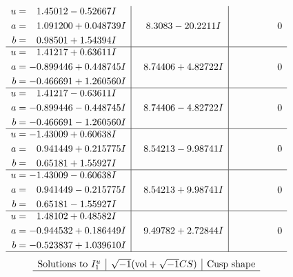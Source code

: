 \documentclass[1p]{elsarticle_modified}
\theoremstyle{definition}
\newcommand{\I}{\sqrt{-1}}
\begin{document}
$$\begin{array}{c|c|c}
\begin{aligned}
u &= \phantom{-}1.45012 - 0.52667 I \\
a &= \phantom{-}1.091200 + 0.048739 I \\
b &= \phantom{-}0.98501 + 1.54394 I\end{aligned}
 & \phantom{-}8.3083 - 20.2211 I & \phantom{-0.000000 } 0 \\ \hline\begin{aligned}
u &= \phantom{-}1.41217 + 0.63611 I \\
a &= -0.899446 + 0.448745 I \\
b &= -0.466691 + 1.260560 I\end{aligned}
 & \phantom{-}8.74406 + 4.82722 I & \phantom{-0.000000 } 0 \\ \hline\begin{aligned}
u &= \phantom{-}1.41217 - 0.63611 I \\
a &= -0.899446 - 0.448745 I \\
b &= -0.466691 - 1.260560 I\end{aligned}
 & \phantom{-}8.74406 - 4.82722 I & \phantom{-0.000000 } 0 \\ \hline\begin{aligned}
u &= -1.43009 + 0.60638 I \\
a &= \phantom{-}0.941449 + 0.215775 I \\
b &= \phantom{-}0.65181 + 1.55927 I\end{aligned}
 & \phantom{-}8.54213 - 9.98741 I & \phantom{-0.000000 } 0 \\ \hline\begin{aligned}
u &= -1.43009 - 0.60638 I \\
a &= \phantom{-}0.941449 - 0.215775 I \\
b &= \phantom{-}0.65181 - 1.55927 I\end{aligned}
 & \phantom{-}8.54213 + 9.98741 I & \phantom{-0.000000 } 0 \\ \hline\begin{aligned}
u &= \phantom{-}1.48102 + 0.48582 I \\
a &= -0.944532 + 0.186449 I \\
b &= -0.523837 + 1.039610 I\end{aligned}
 & \phantom{-}9.49782 + 2.72844 I & \phantom{-0.000000 } 0\\
 \hline 
 \end{array}$$\newpage$$\begin{array}{c|c|c}  
\text{Solutions to }I^u_{1}& \I (\text{vol} + \sqrt{-1}CS) & \text{Cusp shape}\\
 \hline 

\end{array}$$
\end{document}
